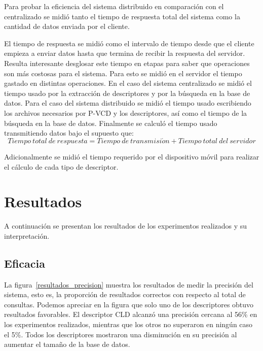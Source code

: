 Para probar la eficiencia del sistema distribuido en comparación con el centralizado se midió tanto el tiempo de respuesta total del sistema como la cantidad de datos enviada por el cliente. 

El tiempo de respuesta se midió como el intervalo de tiempo desde que el cliente empieza a enviar datos hasta que termina de recibir la respuesta del servidor. Resulta interesante desglosar este tiempo en etapas para saber que operaciones son más costosas para el sistema. Para esto se midió en el servidor el tiempo gastado en distintas operaciones. En el caso del sistema centralizado se midió el tiempo usado por la extracción de descriptores y por la búsqueda en la base de datos. Para el caso del sistema distribuido se midió el tiempo usado escribiendo los archivos necesarios por P-VCD y los descriptores, así como el tiempo de la búsqueda en la base de datos. Finalmente se calculó el tiempo usado transmitiendo datos bajo el supuesto que:
\begin{equation*}
\displaystyle{Tiempo\ total\ de\ respuesta}  =  \displaystyle{Tiempo\ de\ transmisi\acute{o}n} + \displaystyle{Tiempo\ total\ del\ servidor} 
\end{equation*}

Adicionalmente se midió el tiempo requerido por el dispositivo móvil para realizar el cálculo de cada tipo de descriptor.

\section{Resultados}\label{resultados}
A continuación se presentan los resultados de los experimentos realizados y su interpretación. 

\subsection{Eficacia}

La figura~\ref{resultados_precision} muestra los resultados de medir la precisión del sistema, esto es, la proporción de resultados correctos con respecto al total de consultas. Podemos apreciar en la figura que  solo uno de los descriptores obtuvo resultados favorables. El descriptor CLD alcanzó una precisión cercana al 56\% en los experimentos realizados, mientras que los otros no superaron en ningún caso el 5\%. Todos los descriptores mostraron una disminución en su precisión al aumentar el tamaño de la base de datos.

